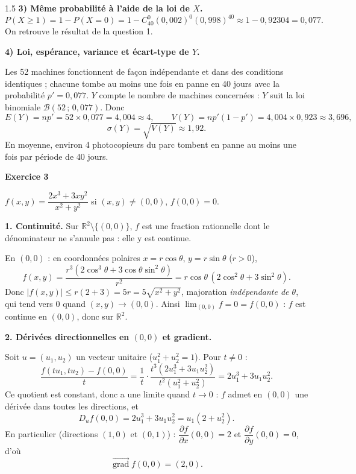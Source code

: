 \documentclass[12pt]{article}
\begin{document}
\begin{spacing}{1.5}
\textbf{3) Même probabilité à l'aide de la loi de $X$.}
\[
P(X\ge1)=1-P(X=0)=1-C_{40}^0(0{,}002)^0(0{,}998)^{40}\approx1-0{,}92304=\boxed{0{,}077}.
\]
On retrouve le résultat de la question 1.


\textbf{4) Loi, espérance, variance et écart-type de $Y$.}

Les 52 machines fonctionnent de façon indépendante et dans des conditions identiques ; chacune tombe au moins une fois en panne en 40 jours avec la probabilité $p'=0{,}077$. $Y$ compte le nombre de machines concernées : $Y$ suit la loi binomiale $\mathcal{B}(52\,;\,0{,}077)$. Donc
\[
E(Y)=np'=52\times0{,}077=4{,}004\approx4,\qquad V(Y)=np'(1-p')=4{,}004\times0{,}923\approx3{,}696,
\]
\[
\sigma(Y)=\sqrt{V(Y)}\approx1{,}92 .
\]
En moyenne, environ 4 photocopieurs du parc tombent en panne au moins une fois par période de 40 jours.

\medskip\textbf{Exercice 3}

$f(x,y)=\dfrac{2x^3+3xy^2}{x^2+y^2}$ si $(x,y)\neq(0,0)$, $f(0,0)=0$.

\textbf{1. Continuité.} Sur $\mathbb{R}^2\setminus\{(0,0)\}$, $f$ est une fraction rationnelle dont le dénominateur ne s'annule pas : elle y est continue.

En $(0,0)$ : en coordonnées polaires $x=r\cos\theta$, $y=r\sin\theta$ ($r>0$),
\[
f(x,y)=\frac{r^3(2\cos^3\theta+3\cos\theta\sin^2\theta)}{r^2}=r\cos\theta\,(2\cos^2\theta+3\sin^2\theta).
\]
Donc $|f(x,y)|\le r(2+3)=5r=5\sqrt{x^2+y^2}$, majoration \emph{indépendante de $\theta$}, qui tend vers $0$ quand $(x,y)\to(0,0)$. Ainsi $\lim_{(0,0)}f=0=f(0,0)$ : $f$ est continue en $(0,0)$, donc sur $\mathbb{R}^2$.

\textbf{2. Dérivées directionnelles en $(0,0)$ et gradient.}

Soit $u=(u_1,u_2)$ un vecteur unitaire ($u_1^2+u_2^2=1$). Pour $t\neq0$ :
\[
\frac{f(tu_1,tu_2)-f(0,0)}{t}=\frac1t\cdot\frac{t^3(2u_1^3+3u_1u_2^2)}{t^2(u_1^2+u_2^2)}=2u_1^3+3u_1u_2^2 .
\]
Ce quotient est constant, donc a une limite quand $t\to0$ : $f$ admet en $(0,0)$ une dérivée dans toutes les directions, et
\[
\boxed{D_uf(0,0)=2u_1^3+3u_1u_2^2=u_1(2+u_2^2)}.
\]
En particulier (directions $(1,0)$ et $(0,1)$) : $\dfrac{\partial f}{\partial x}(0,0)=2$ et $\dfrac{\partial f}{\partial y}(0,0)=0$, d'où
\[
\boxed{\overrightarrow{\operatorname{grad}}f(0,0)=(2,0)}.
\]


\end{spacing}
\end{document}
